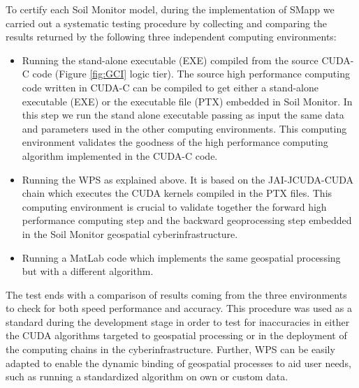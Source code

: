\documentclass[APA,LATO1COL,doublespace]{WileyNJD-v2}
\begin{document}
To certify each Soil Monitor model, during the implementation of SMapp we carried out a systematic testing procedure 
by collecting and comparing the results returned by the following three independent computing environments:
\begin{itemize}
    \item Running the stand-alone executable (EXE) compiled from the source CUDA-C code (Figure \ref{fig:GCI} logic tier).
    The source high performance computing code written in CUDA-C can be compiled to get either a stand-alone executable (EXE) or the executable file (PTX) embedded in Soil Monitor.
    In this step we run the stand alone executable passing as input the same data and parameters used in the other computing environments.
    This computing environment validates the goodness of the high performance computing algorithm implemented in the CUDA-C code.
    \item Running the WPS as explained above.
    It is based on the JAI-JCUDA-CUDA chain which executes the CUDA kernels compiled in the PTX files. This computing environment is crucial to validate together the forward high performance computing step and the backward geoprocessing step embedded in the Soil Monitor geospatial cyberinfrastructure. 
    \item Running a MatLab code which implements the same geospatial processing but with a different algorithm.
\end{itemize}

The test ends with a comparison of results coming from the three environments to check for both speed performance and accuracy. 
This procedure was used as a standard during the development stage in order to test for inaccuracies in either the CUDA algorithms targeted to geospatial processing or in the deployment of the computing chains in the cyberinfrastructure.
Further, WPS can be easily adapted to enable the dynamic binding of geospatial processes to aid user needs, such as running a standardized algorithm on own or custom data.
\end{document}
